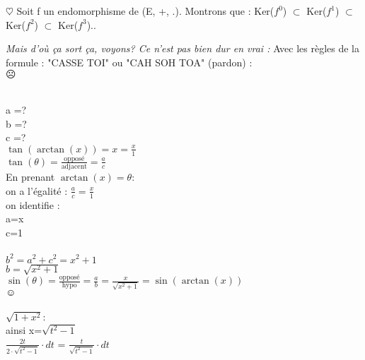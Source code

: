 \documentclass[a4paper,10pt]{article}
\begin{document}
 $\heartsuit$ Soit f un endomorphisme de (E, +, .). Montrons que : Ker($f^0$) $\subset$ Ker($f^1$) $\subset$  Ker($f^2$) $\subset$  Ker($f^3$)..

\textit{Mais d'où ça sort ça, voyons? Ce n'est pas bien dur en vrai :}
Avec les règles de la formule : "CASSE TOI" ou "CAH SOH TOA" (pardon) :\\
$\frownie{}$\\ 

\\


\parindent=2cm a =?\\
\parindent=2cm b =?\\
\parindent=2cm c =?\\

\parindent=0cm $\tan(\arctan(x))= x = \frac{x}{1}$\\

 $\tan(\theta) = \frac{\text{opposé}}{\text{adjacent}} = \frac{a}{c}$\\
En prenant $\arctan(x)=\theta:$\\
on a l'égalité : $\frac{a}{c} = \frac{x}{1}$ \\
on identifie :\\
\parindent=2cm a=x\\
\parindent=2cm c=1\\

\parindent=0cm  \\
\parindent=2cm $b^2 = a^2 + c^2 = x^2 + 1 $\\
\parindent=2cm $b = \sqrt{x^2+1}$\\

\parindent=0cm  $\sin(\theta) =\frac{\text{opposé}}{\text{hypo}}  = \frac{a}{b} = \frac{x}{\sqrt{x^2+1}} = \sin(\arctan(x))$\\

$\smiley{}$\\
\\
 $\sqrt{1+x^2}$: \\
ainsi x=$\sqrt{t^2-1}$ \\
 $\frac{2t}{2\cdot \sqrt{t^2-1}} \cdot dt$ = $\frac{t}{\sqrt{t^2-1}} \cdot dt$ \\
\end{document}
